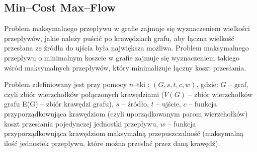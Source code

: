 \documentclass[licencjacka]{pracamgr}
\begin{document}
    \subsection{Min--Cost Max--Flow}
Problem maksymalnego przepływu w grafie zajmuje się wyznaczeniem wielkości przepływów, jakie należy puścić po krawędziach grafu, aby łączna wielkość przesłana ze źródła
do ujścia była największa możliwa.
Problem maksymalnego przepływu o minimalnym koszcie w grafie zajmuje się wyznaczeniem takiego wśród maksymalnych przepływów, który minimalizuje łączny koszt przesłania.

Problem zdefiniowany jest przy pomocy $n$--tki : $(G,s,t,c,w)$, gdzie:\newline
$G$ -- graf, czyli zbiór wierzchołków połączonych krawędziami ($V(G)$ -- zbiór wierzchołków grafu E(G) -- zbiór krawędzi grafu), $s$ -- źródło, $t$ -- ujście,
$c$ -- funkcja przyporządkowująca krawędziom (czyli uporządkowanym parom wierzchołków) koszt przesłania pojedynczej jednostki przepływu,
$w$ -- funkcja przyporządkowująca krawędziom maksymalną przepuszczalność (maksymalną ilość jednostek przepływu, które można przesłać przez daną krawędź).
\end{document}
